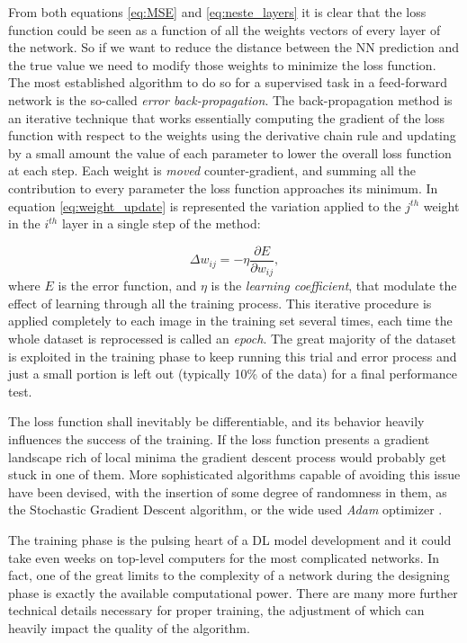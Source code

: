 From both equations \ref{eq:MSE} and \ref{eq:neste_layers} it is clear that the loss function could be seen as a function of all the weights vectors of every layer of the network. So if we want to reduce the distance between the NN prediction and the true value we need to modify those weights to minimize the loss function. The most established algorithm to do so for a supervised task in a feed-forward network is the so-called \textit{error back-propagation}. The back-propagation method is an iterative technique that works essentially computing the gradient of the loss function with respect to the weights using the derivative chain rule and updating by a small amount the value of each parameter to lower the overall loss function at each step. Each weight is  \textit{moved} counter-gradient, and summing all the contribution to every parameter the loss function approaches its minimum. In equation \ref{eq:weight_update} is represented the variation applied to the $j^{th}$ weight in the $i^{th}$ layer in a single step of the method:

\begin{equation}
    \Delta w_{ij} = - \eta \frac{\partial E}{\partial w_{ij}},
    \label{eq:weight_update}
\end{equation}
where $E$ is the error function, and $\eta$ is the \textit{learning coefficient}, that modulate the effect of learning through all the training process. This iterative procedure is applied completely to each image in the training set several times, each time the whole dataset is reprocessed is called an \textit{epoch}. The great majority of the dataset is exploited in the training phase to keep running this trial and error process and just a small portion is left out (typically 10\% of the data) for a final performance test.

The loss function shall inevitably be differentiable, and its behavior heavily influences the success of the training. If the loss function presents a gradient landscape rich of local minima the gradient descent process would probably get stuck in one of them. More sophisticated algorithms capable of avoiding this issue have been devised, with the insertion of some degree of randomness in them, as the Stochastic Gradient Descent algorithm, or the wide used \textit{Adam} optimizer \cite{1412.6980}.

The training phase is the pulsing heart of a DL model development and it could take even weeks on top-level computers for the most complicated networks. In fact, one of the great limits to the complexity of a network during the designing phase is exactly the available computational power. There are many more further technical details necessary for proper training, the adjustment of which can heavily impact the quality of the algorithm.

